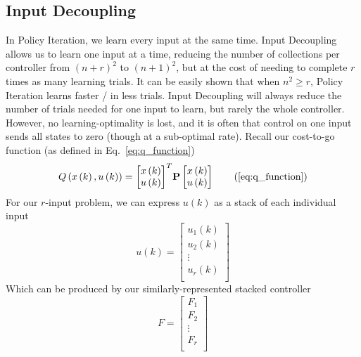 \FloatBarrier\subsection{Input Decoupling} %
In Policy Iteration, we learn every input at the same time. Input Decoupling allows us to learn one input at a time, reducing the number of collections per controller from ${\left(n+r\right)}^2$ to ${\left(n+1\right)}^2$, but at the cost of needing to complete $r$ times as many learning trials. It can be easily shown that when $n^2\geq r$, Policy Iteration learns faster / in less trials. Input Decoupling will always reduce the number of trials needed for one input to learn, but rarely the whole controller. However, no learning-optimality is lost, and it is often that control on one input sends all states to zero (though at a sub-optimal rate). Recall our cost-to-go function (as defined in Eq.~\ref{eq:q_function})
\begin{equation}
    Q\left(x\left(k\right),u\left(k\right)\right)={\left[\begin{matrix}x\left(k\right)\\u\left(k\right)\\\end{matrix}\right]}^T\textbf{P}\left[\begin{matrix}x\left(k\right)\\u\left(k\right)\\\end{matrix}\right] 
    \tag{\ref{eq:q_function}}
\end{equation}
For our $r$-input problem, we can express $u\left(k\right)$ as a stack of each individual input
\begin{equation}
    u\left(k\right)=\left[\begin{matrix}u_1\left(k\right)\\u_2\left(k\right)\\\vdots\\u_r\left(k\right)\\\end{matrix}\right]
    \label{eq:stacked_inputs}
\end{equation}
Which can be produced by our similarly-represented stacked controller
\begin{equation}
    F=\left[\begin{matrix}F_1\\F_2\\\vdots\\F_r\\\end{matrix}\right]
    \label{eq:stacked_controllers}
\end{equation}
